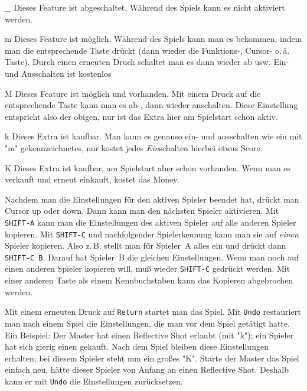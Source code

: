 \documentclass[12pt,twoside]{article}
\newcommand{\deflabel}[1]{\bf #1\hfill}%
\newenvironment{deflist}[1]%
{\begin{list}{}%
{\settowidth{\labelwidth}{\bf #1}%
\setlength{\leftmargin}{\labelwidth}%
\addtolength{\leftmargin}{\labelsep}%
\renewcommand{\makelabel}{\deflabel}}}%
{\end{list}}%
\begin{document}
\begin{deflist}{M}

\item[\_] Dieses Feature ist abgeschaltet. W\"ahrend des Spiels kann es nicht 
aktiviert werden.


\item[m] Dieses Feature ist m\"oglich. W\"ahrend des Spiels kann man es 
bekommen, indem man die entsprechende Taste dr\"uckt (dann wieder die 
\mbox{Funktions-,} Cursor- o.\,\"a. Taste). Durch einen erneuten Druck 
schaltet man es dann wieder ab usw. Ein- und Ausschalten ist kostenlos


\item[M] Dieses Feature ist m\"oglich und vorhanden. Mit einem Druck auf die 
entsprechende Taste kann man es ab-, dann wieder anschalten. Diese 
Einstellung entspricht also der obigen, nur ist das Extra hier am Spielstart 
schon aktiv.


\item[k] Dieses Extra ist kaufbar. Man kann es genauso ein- und ausschalten 
wie ein mit "m" gekennzeichnetes, nur kostet jedes {\em Ein\/}schalten 
hierbei etwas Score.


\item[K] Dieses Extra ist kaufbar, am Spielstart aber schon vorhanden. Wenn 
man es verkauft und erneut einkauft, kostet das Money.

\end{deflist}


Nachdem man die Einstellungen f\"ur den aktiven Spieler beendet hat, dr\"uckt 
man Cursor up oder down. Dann kann man den n\"achsten Spieler aktivieren. Mit 
\verb|SHIFT-A| kann man die Einstellungen des aktiven Spieler auf alle 
anderen Spieler kopieren. Mit \verb|SHIFT-C| und nachfolgender 
Spielerkennung kann man sie auf {\em einen\/} Spieler kopieren. Also z.\,B. 
stellt man f\"ur Spieler~A alles ein und dr\"uckt dann \verb|SHIFT-C B|. Darauf 
hat Spieler~B die gleichen Einstellungen. Wenn man noch auf einen anderen 
Spieler kopieren will, mu\ss{} wieder \verb|SHIFT-C| gedr\"uckt werden. Mit einer 
anderen Taste als einem Kennbuchstaben kann das Kopieren abgebrochen werden.


Mit einem erneuten Druck auf \verb|Return| startet man das Spiel. Mit 
\verb|Undo| restauriert man nach einem Spiel die Einstellungen, die man vor 
dem Spiel get\"atigt hatte. Ein Beispiel: Der Master hat einen Reflective Shot 
erlaubt (mit "k"); ein Spieler hat sich gierig einen gekauft. Nach dem 
Spiel bleiben diese Einstellungen erhalten; bei diesem Spieler steht nun ein 
gro\ss{}es "K". Starte der Master das Spiel einfach neu, h\"atte dieser Spieler 
von Anfang an einen Reflective Shot. Deshalb kann er mit \verb|Undo| die 
Einstellungen zur\"ucksetzen.
\end{document}
